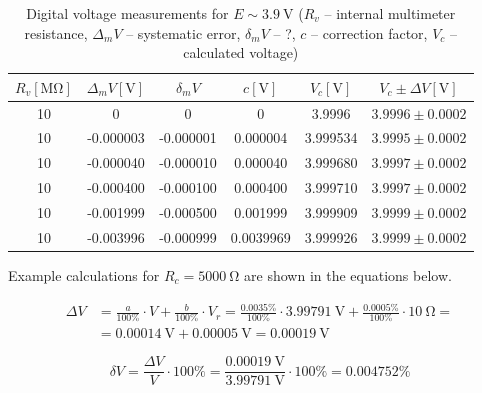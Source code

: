 \begin{table}[H]
	\centering
	\begin{tabular}{  c | c | c | c | c | c}
		 $R_v [\unit{\mega\ohm}]$ & $\Delta_m V [\unit{\volt}]$ & $\delta_m V$ & $c [\unit{\volt}]$ & $V_c [\unit{\volt}]$ & $V_c \pm \Delta V [\unit{\volt}]$\\
		\hline
		10 & 0 & 0 & 0 & 3.9996 & $3.9996 \pm 0.0002$\\
		\hline
		10 & -0.000003 & -0.000001 & 0.000004 & 3.999534 & $3.9995 \pm 0.0002$\\
		\hline
		10 & -0.000040 & -0.000010 & 0.000040 & 3.999680 & $3.9997 \pm 0.0002$\\
		\hline
		10 & -0.000400 & -0.000100 & 0.000400 & 3.999710 & $3.9997 \pm 0.0002$\\
		\hline
		10 & -0.001999 & -0.000500 & 0.001999 & 3.999909 &$ 3.9999 \pm 0.0002$\\
		\hline
		10 & -0.003996 & -0.000999& 0.0039969 & 3.999926 & $3.9999 \pm 0.0002$\\
	\end{tabular}
	\caption{Digital voltage measurements for $E \sim \SI{3.9}{\volt}$ ($R_v$ -- internal multimeter resistance, $\Delta_m V$ -- systematic error, $\delta_m V$ -- ?, $c$ -- correction factor, $V_c$ -- calculated voltage)}
	\label{tab:digital_voltage_2}
\end{table}

Example calculations for $R_c = \SI{5000}{\ohm}$ are shown in the equations below. %

\begin{equation}
	\begin{split}
		\Delta V &= \frac{a}{100\unit{\percent}}\cdot V + 	\frac{b}{100\unit{\percent}}\cdot V_r = \frac{0.0035\unit{\percent}}{100\unit{\percent}}\cdot\SI{3.99791}{\volt} + \frac{0.0005\unit{\percent}}{100\unit{\percent}}\cdot\SI{10}{\ohm} =\\
		&= \SI{0.00014}{\volt} + \SI{0.00005}{\volt} = \SI{0.00019}{\volt}
	\end{split}
	\label{eq:digital_Delta_V}
\end{equation}

\begin{equation}
	\delta V = \frac{\Delta V}{V}\cdot 100\unit{\percent} = \frac{\SI{0.00019}{\volt}}{\SI{3.99791}{\volt}}\cdot 100\unit{\percent} = 0.004752\unit{\percent}
	\label{eq:digital_delta_V}
\end{equation}

